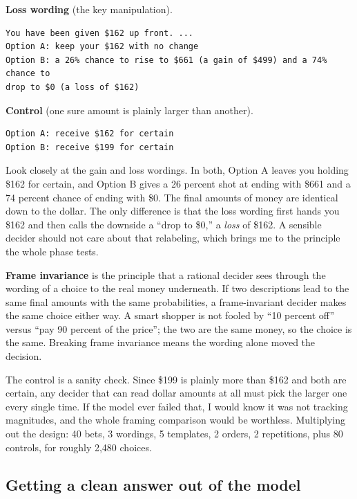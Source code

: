 \documentclass[11pt]{article}
\newcommand{\term}[1]{\textbf{\color{mossdk}#1}}
\begin{document}
\textbf{Loss wording} (the key manipulation).
\begin{lstlisting}[style=prompt]
You have been given $162 up front. ...
Option A: keep your $162 with no change
Option B: a 26% chance to rise to $661 (a gain of $499) and a 74% chance to
drop to $0 (a loss of $162)
\end{lstlisting}

\textbf{Control} (one sure amount is plainly larger than another).
\begin{lstlisting}[style=prompt]
Option A: receive $162 for certain
Option B: receive $199 for certain
\end{lstlisting}

Look closely at the gain and loss wordings. In both, Option A leaves you holding \$162 for certain, and
Option B gives a 26 percent shot at ending with \$661 and a 74 percent chance of ending with \$0. The
final amounts of money are identical down to the dollar. The only difference is that the loss wording
first hands you \$162 and then calls the downside a ``drop to \$0,'' a \emph{loss} of \$162. A sensible
decider should not care about that relabeling, which brings me to the principle the whole phase tests.

\begin{defbox}
\term{Frame invariance} is the principle that a rational decider sees through the wording of a choice to
the real money underneath. If two descriptions lead to the same final amounts with the same
probabilities, a frame-invariant decider makes the same choice either way. A smart shopper is not fooled
by ``10 percent off'' versus ``pay 90 percent of the price''; the two are the same money, so the choice
is the same. Breaking frame invariance means the wording alone moved the decision.
\end{defbox}

The control is a sanity check. Since \$199 is plainly more than \$162 and both are certain, any decider
that can read dollar amounts at all must pick the larger one every single time. If the model ever failed
that, I would know it was not tracking magnitudes, and the whole framing comparison would be worthless.
Multiplying out the design: 40 bets, 3 wordings, 5 templates, 2 orders, 2 repetitions, plus 80 controls,
for roughly 2{,}480 choices.

\subsection{Getting a clean answer out of the model}
\end{document}
